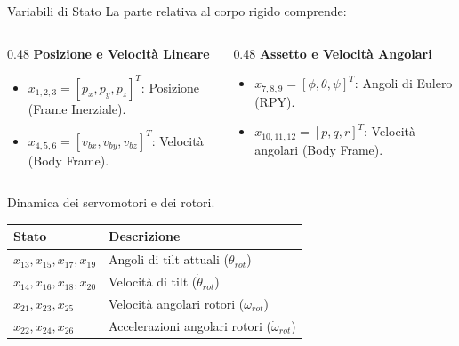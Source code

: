 \documentclass[aspectratio=169]{beamer} %
\begin{document}
\begin{frame}{Variabili di Stato}
    La parte relativa al corpo rigido comprende:
        \vspace{0.2cm}
        \begin{columns}[T]
            \begin{column}{0.48\textwidth}
                \textbf{Posizione e Velocità Lineare}
                \begin{itemize}
                    \item $x_{1,2,3} = [p_x, p_y, p_z]^T$: Posizione (Frame Inerziale).
                    \item $x_{4,5,6} = [v_{bx}, v_{by}, v_{bz}]^T$: Velocità (Body Frame).
                \end{itemize}
            \end{column}
            
            \begin{column}{0.48\textwidth}
                \textbf{Assetto e Velocità Angolari}
                \begin{itemize}
                    \item $x_{7,8,9} = [\phi, \theta, \psi]^T$: Angoli di Eulero (RPY).
                    \item $x_{10,11,12} = [p, q, r]^T$: Velocità angolari (Body Frame).
                \end{itemize}
            \end{column}
        \end{columns}

    \vspace{0.5em}
    Dinamica dei servomotori e dei rotori.
        \footnotesize
        \begin{table}
            
            \begin{tabular}{ll}
                \toprule
                \textbf{Stato} & \textbf{Descrizione} \\
                \midrule
                $x_{13}, x_{15}, x_{17}, x_{19}$ & Angoli di tilt attuali ($\theta_{rot}$) \\
                $x_{14}, x_{16}, x_{18}, x_{20}$ & Velocità di tilt ($\dot{\theta}_{rot}$) \\
                \midrule
                $x_{21}, x_{23}, x_{25}$ & Velocità angolari rotori ($\omega_{rot}$) \\
                $x_{22}, x_{24}, x_{26}$ & Accelerazioni angolari rotori ($\dot{\omega}_{rot}$) \\
                \bottomrule
            \end{tabular}
        \end{table}
\end{frame}
\end{document}
